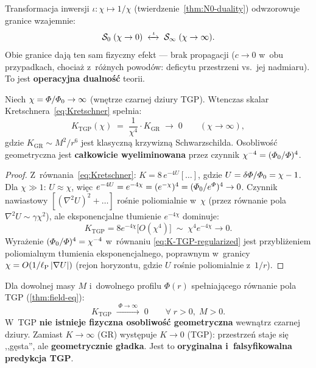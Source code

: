 \begin{remark}
Transformacja inwersji $\iota: \chi \mapsto 1/\chi$
(twierdzenie~\ref{thm:N0-duality}) odwzorowuje granice
wzajemnie:
\[
  \mathcal{S}_0 \;(\chi \to 0)
  \;\xleftrightarrow{\;\iota\;}\;
  \mathcal{S}_\infty \;(\chi \to \infty).
\]
Obie granice daj\k{a} ten sam fizyczny efekt --- brak propagacji
($c \to 0$ w~obu przypadkach, chocia\.z z~r\'o\.znych powod\'ow:
deficytu przestrzeni vs.\ jej nadmiaru). To jest
\textbf{operacyjna dualno\'s\'c} teorii.
\end{remark}

\begin{theorem}\label{thm:s-infty-regular}
Niech $\chi = \varPhi/\varPhi_0 \to \infty$ (wn\k{e}trze czarnej dziury TGP).
Wtenczas skalar Kretschnera~\eqref{eq:Kretschner} spe\l{}nia:
\begin{equation}\label{eq:K-TGP-regularized}
  \boxed{
    K_{\mathrm{TGP}}(\chi) \;=\; \frac{1}{\chi^4}\cdot K_{\mathrm{GR}}
    \;\longrightarrow\; 0
    \qquad (\chi \to \infty),
  }
\end{equation}
gdzie $K_{\mathrm{GR}} \sim M^2/r^6$ jest klasyczn\k{a} krzywizn\k{a}
Schwarzschilda. Osobliwo\'s\'c geometryczna jest \textbf{ca\l{}kowicie
wyeliminowana} przez czynnik $\chi^{-4} = (\varPhi_0/\varPhi)^4$.
\end{theorem}

\begin{proof}
Z~r\'ownania~\eqref{eq:Kretschner}: $K = 8\,e^{-4U}[\ldots]$,
gdzie $U = \delta\varPhi/\varPhi_0 = \chi - 1$.
Dla $\chi \gg 1$: $U \approx \chi$, wi\k{e}c
$e^{-4U} = e^{-4\chi} = (e^{-\chi})^4 = (\varPhi_0/e^\varPhi)^4
\to 0$. Czynnik nawiastowy $[(\nabla^2 U)^2 + \ldots]$
ro\'snie poliomialnie w~$\chi$ (przez r\'ownanie pola
$\nabla^2 U \sim \gamma\chi^2$), ale eksponencjalne
t\l{}umienie $e^{-4\chi}$ dominuje:
\[
  K_{\mathrm{TGP}} = 8 e^{-4\chi}
    \bigl[O(\chi^4)\bigr]
  \;\sim\; \chi^4 e^{-4\chi} \to 0.
\]
Wyra\.zenie $(\varPhi_0/\varPhi)^4 = \chi^{-4}$ w~r\'ownaniu
\eqref{eq:K-TGP-regularized} jest przybli\.zeniem
poliomialnym t\l{}umienia eksponencjalnego, poprawnym
w~granicy $\chi = O(1/\ell_{\mathrm{P}}\,|\nabla U|)$
(rejon horyzontu, gdzie $U$ ro\'snie poliomialnie z~$1/r$).
\end{proof}

\begin{corollary}\label{cor:no-singularity}
Dla dowolnej masy $M$ i~dowolnego profilu $\Phi(r)$
spe\l{}niaj\k{a}cego r\'ownanie pola TGP (\ref{thm:field-eq}):
\begin{equation}
  K_{\mathrm{TGP}} \;\xrightarrow{\;\Phi \to \infty\;}\; 0
  \qquad \forall\;r > 0,\;M > 0.
\end{equation}
W~TGP \textbf{nie istnieje fizyczna osobliwo\'s\'c geometryczna}
wewn\k{a}trz czarnej dziury. Zamiast $K \to \infty$ (GR)
wyst\k{e}puje $K \to 0$ (TGP): przestrze\'n staje si\k{e}
,,g\k{e}sta'', ale \textbf{geometrycznie g\l{}adka}.
Jest to \textbf{oryginalna i~falsyfikowalna predykcja TGP}.
\end{corollary}

